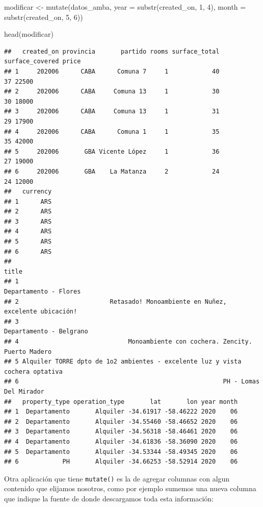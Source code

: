\documentclass[
  spanish,
]{book}
\newenvironment{Shaded}{\begin{snugshade}}{\end{snugshade}}
\newcommand{\AttributeTok}[1]{\textcolor[rgb]{0.77,0.63,0.00}{#1}}
\newcommand{\DecValTok}[1]{\textcolor[rgb]{0.00,0.00,0.81}{#1}}
\newcommand{\FunctionTok}[1]{\textcolor[rgb]{0.00,0.00,0.00}{#1}}
\newcommand{\NormalTok}[1]{#1}
\newcommand{\OtherTok}[1]{\textcolor[rgb]{0.56,0.35,0.01}{#1}}
\begin{document}
\begin{Shaded}
\begin{Highlighting}[]
\NormalTok{modificar }\OtherTok{\textless{}{-}} \FunctionTok{mutate}\NormalTok{(datos\_amba,}
                    \AttributeTok{year =} \FunctionTok{substr}\NormalTok{(created\_on, }\DecValTok{1}\NormalTok{, }\DecValTok{4}\NormalTok{),}
                    \AttributeTok{month =} \FunctionTok{substr}\NormalTok{(created\_on, }\DecValTok{5}\NormalTok{, }\DecValTok{6}\NormalTok{))}

\FunctionTok{head}\NormalTok{(modificar)}
\end{Highlighting}
\end{Shaded}

\begin{verbatim}
##   created_on provincia       partido rooms surface_total surface_covered price
## 1     202006      CABA      Comuna 7     1            40              37 22500
## 2     202006      CABA     Comuna 13     1            30              30 18000
## 3     202006      CABA     Comuna 13     1            31              29 17900
## 4     202006      CABA      Comuna 1     1            35              35 42000
## 5     202006       GBA Vicente López     1            36              27 19000
## 6     202006       GBA    La Matanza     2            24              24 12000
##   currency
## 1      ARS
## 2      ARS
## 3      ARS
## 4      ARS
## 5      ARS
## 6      ARS
##                                                                           title
## 1                                                         Departamento - Flores
## 2                         Retasado! Monoambiente en Nuñez, excelente ubicación!
## 3                                                       Departamento - Belgrano
## 4                              Monoambiente con cochera. Zencity. Puerto Madero
## 5 Alquiler TORRE dpto de 1o2 ambientes - excelente luz y vista cochera optativa
## 6                                                        PH - Lomas Del Mirador
##   property_type operation_type       lat       lon year month
## 1  Departamento       Alquiler -34.61917 -58.46222 2020    06
## 2  Departamento       Alquiler -34.55460 -58.46652 2020    06
## 3  Departamento       Alquiler -34.56318 -58.46461 2020    06
## 4  Departamento       Alquiler -34.61836 -58.36090 2020    06
## 5  Departamento       Alquiler -34.53344 -58.49345 2020    06
## 6            PH       Alquiler -34.66253 -58.52914 2020    06
\end{verbatim}

Otra aplicación que tiene \texttt{mutate()} es la de agregar columnas con algun contenido que elijamos nosotros, como por ejemplo sumemos una nueva columna que indique la fuente de donde descargamos toda esta información:
\end{document}

